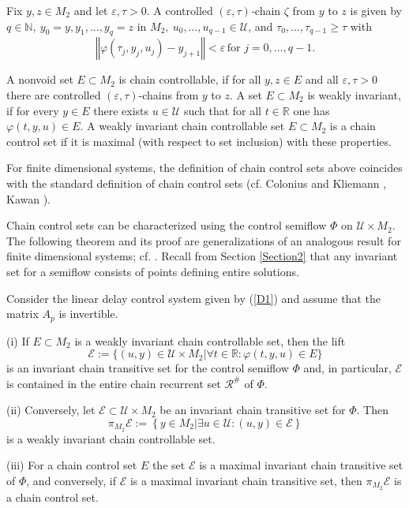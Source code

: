 \documentclass{siamltex}%
\begin{document}
Fix $y,z\in M_{2}$ and let $\varepsilon,\tau>0$. A controlled $(\varepsilon
,\tau)$\textit{-}chain $\zeta$ from $y$ to $z$ is given by $q\in
\mathbb{N},\ y_{0}=y,y_{1},\ldots,y_{q}=z$ in $M_{2},\ u_{0},\ldots,u_{q-1}%
\in\mathcal{U}$, and $\tau_{0},\ldots,\tau_{q-1}\geq\tau$ with
\[
\left\Vert \varphi(\tau_{j},y_{j},u_{j})-y_{j+1}\right\Vert <\varepsilon\text{
}\,\text{for }j=0,\ldots,q-1.
\]


\begin{definition}
\label{Definition_chain}A nonvoid set $E\subset M_{2}$ is chain controllable,
if for all $y,z\in E$ and all $\varepsilon,\tau>0$ there are controlled
$(\varepsilon,\tau)$-chains from $y$ to $z$. A set $E\subset M_{2}$ is weakly
invariant, if for every $y\in E$ there exists $u\in\mathcal{U}$ such that for
all $t\in\mathbb{R}$ one has $\varphi(t,y,u)\in E$. A weakly invariant chain
controllable set $E\subset M_{2}$ is a chain control set if it is maximal
(with respect to set inclusion) with these properties.
\end{definition}

For finite dimensional systems, the definition of chain control sets above
coincides with the standard definition of chain control sets (cf. Colonius and
Kliemann \cite{ColK00}, Kawan \cite{Kawan13}).

Chain control sets can be characterized using the control semiflow $\Phi$ on
$\mathcal{U}\times M_{2}$. The following theorem and its proof are
generalizations of an analogous result for finite dimensional systems; cf.
\cite[Theorem 4.3.11]{ColK00}. Recall from Section \ref{Section2} that any
invariant set for a semiflow consists of points defining entire solutions.

\begin{theorem}
\label{Theorem_equivalence}Consider the linear delay control system given by
(\ref{D1}) and assume that the matrix $A_{p}$ is invertible.

(i) If $E\subset M_{2}$ is a weakly invariant chain controllable set, then the
lift%
\[
\mathcal{E}:=\{(u,y)\in\mathcal{U}\times M_{2}\left\vert \forall
t\in\mathbb{R}:\varphi(t,y,u)\in E\right.  \}
\]
is an invariant chain transitive set for the control semiflow $\Phi$ and, in
particular, $\mathcal{E}$ is contained in the entire chain recurrent set
$\mathcal{R}^{\#}$ of $\Phi$.

(ii) Conversely, let $\mathcal{E}\subset\mathcal{U}\times M_{2}$ be an
invariant chain transitive set for $\Phi$. Then%
\[
\pi_{M_{2}}\mathcal{E}:=\left\{  y\in M_{2}\left\vert \exists u\in
\mathcal{U}:(u,y)\in\mathcal{E}\right.  \right\}
\]
is a weakly invariant chain controllable set.

(iii) For a chain control set $E$ the set $\mathcal{E}$ is a maximal invariant
chain transitive set of $\Phi$, and conversely, if $\mathcal{E}$ is a maximal
invariant chain transitive set, then $\pi_{M_{2}}\mathcal{E}$ is a chain
control set.
\end{theorem}
\end{document}

